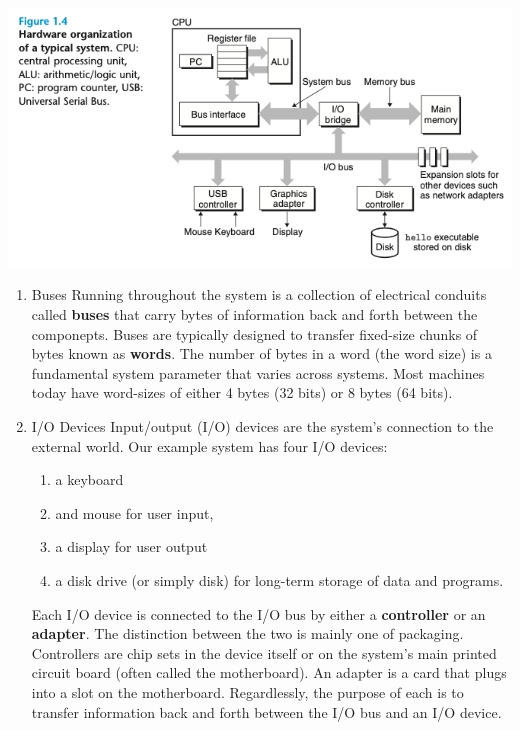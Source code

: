 \documentclass[11pt]{article}
\begin{document}
\begin{center}
\includegraphics[width=.9\linewidth]{pics/hardware-organization.png}
\end{center}
\begin{enumerate}
\item Buses
\label{sec:orgaca900e}
Running throughout the system is a collection of electrical conduits called \textbf{buses} that carry bytes of information back and forth between the componepts.  Buses are typically designed to transfer fixed-size chunks of bytes known as \textbf{words}. The number of bytes in a word (the word size) is a fundamental system parameter that varies across systems. Most machines today have word-sizes of either 4 bytes (32 bits) or 8 bytes (64 bits).\\

\item I/O Devices
\label{sec:org40e9ae6}
Input/output (I/O) devices are the system's connection to the external world. Our example system has four I/O devices:\\
\begin{enumerate}
\item a keyboard\\
\item and mouse for user input,\\
\item a display for user output\\
\item a disk drive (or simply disk) for long-term storage of data and programs.\\
\end{enumerate}

Each I/O device is connected to the I/O bus by either a \textbf{controller} or an \textbf{adapter}. The distinction between the two is mainly one of packaging. Controllers are chip sets in the device itself or on the system's main printed circuit board (often called the motherboard). An adapter is a card that plugs into a slot on the motherboard. Regardlessly, the purpose of each is to transfer information back and forth between the I/O bus and an I/O device.\\


\end{enumerate}
\end{document}
